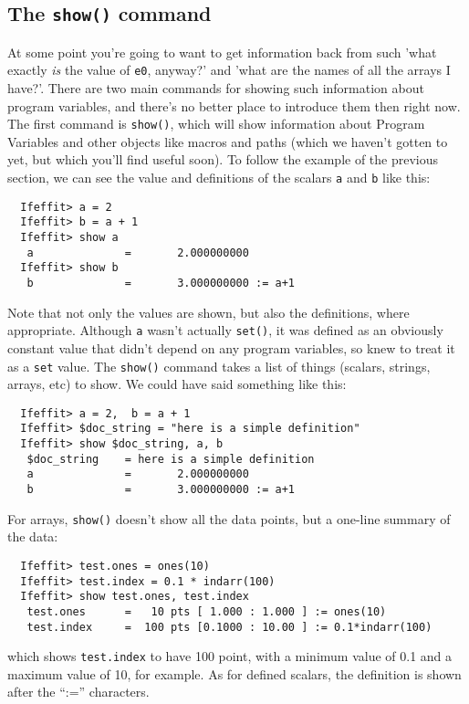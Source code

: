 \documentclass[11pt]{article}
\begin{document}
\subsection{The {\tt{show()}} command}
\label{s:datatypes:show}

At some point you're going to want to get information back from {\ifeffit}
such 'what exactly {\emph{is}} the value of {\tt{e0}}, anyway?' and 'what
are the names of all the arrays I have?'.  There are two main commands for
showing such information about program variables, and there's no better
place to introduce them then right now.  The first command is
{\tt{show()}}, which will show information about Program Variables and
other {\ifeffit} objects like macros and paths (which we haven't gotten to
yet, but which you'll find useful soon).  To follow the example of the
previous section, we can see the value and definitions of the scalars
{\tt{a}} and {\tt{b}} like this:
{\small\begin{verbatim}
  Ifeffit> a = 2
  Ifeffit> b = a + 1
  Ifeffit> show a
   a              =       2.000000000
  Ifeffit> show b
   b              =       3.000000000 := a+1
\end{verbatim}
}\noindent
Note that not only the values are shown, but also the definitions, where
appropriate.  Although {\tt{a}} wasn't actually {\tt{set()}}, it was
defined as an obviously constant value that didn't depend on any program
variables, so {\feffit} knew to treat it as a {\tt{set}} value.  The
{\tt{show()}} command takes a list of things (scalars, strings, arrays,
etc) to show.  We could have said something like this:
{\small\begin{verbatim}
  Ifeffit> a = 2,  b = a + 1
  Ifeffit> $doc_string = "here is a simple definition"
  Ifeffit> show $doc_string, a, b
   $doc_string    = here is a simple definition
   a              =       2.000000000
   b              =       3.000000000 := a+1
\end{verbatim}
}\noindent   %
For arrays, {\tt{show()}} doesn't show all the data points, but a one-line
summary of the data:
{\small\begin{verbatim}
  Ifeffit> test.ones = ones(10)
  Ifeffit> test.index = 0.1 * indarr(100)
  Ifeffit> show test.ones, test.index
   test.ones      =   10 pts [ 1.000 : 1.000 ] := ones(10)
   test.index     =  100 pts [0.1000 : 10.00 ] := 0.1*indarr(100)
\end{verbatim}
}\noindent
which shows {\tt{test.index}} to have 100 point, with a minimum value of
0.1 and a maximum value of 10, for example.  As for defined scalars, the
definition is shown after the ``:='' characters.
\end{document}
